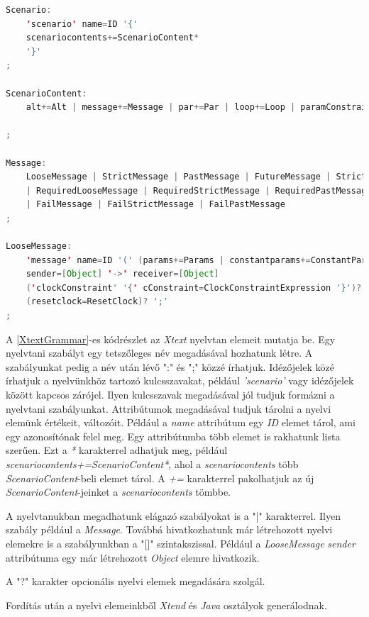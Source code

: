 \begin{lstlisting}[language=java, frame=single, float=ht!, caption={Xtext nyelvtan elemei.},captionpos=b, label=XtextGrammar]
Scenario:
	'scenario' name=ID '{'
	scenariocontents+=ScenarioContent*
	'}'
;

ScenarioContent:
	alt+=Alt | message+=Message | par+=Par | loop+=Loop | paramConstraint+=ParameterConstraint

;

Message:
	LooseMessage | StrictMessage | PastMessage | FutureMessage | StrictFutureMessage
	| RequiredLooseMessage | RequiredStrictMessage | RequiredPastMessage | RequiredFutureMessage | RequiredStrictFutureMessage
	| FailMessage | FailStrictMessage | FailPastMessage
;

LooseMessage:
	'message' name=ID '(' (params+=Params | constantparams+=ConstantParams) ')'
	sender=[Object] '->' receiver=[Object]
	('clockConstraint' '{' cConstraint=ClockConstraintExpression '}')? 
	(resetclock=ResetClock)? ';'
;
\end{lstlisting}

A \ref{XtextGrammar}-es kódrészlet az \textit{Xtext} nyelvtan elemeit mutatja be.
Egy nyelvtani szabályt egy tetszőleges név megadásával hozhatunk létre.
A szabályunkat pedig a név után lévő ":" és ";" közzé írhatjuk.
Idézőjelek közé írhatjuk a nyelvünkhöz tartozó kulcsszavakat, például \textit{'scenario'} vagy idézőjelek között kapcsos zárójel.
Ilyen kulcsszavak megadásával jól tudjuk formázni a nyelvtani szabályunkat.
Attribútumok megadásával tudjuk tárolni a nyelvi elemünk értékeit, változóit.
Például a \textit{name} attribútum egy \textit{ID} elemet tárol, ami egy azonosítónak felel meg.
Egy attribútumba több elemet is rakhatunk lista szerűen.
Ezt a \textit{*} karakterrel adhatjuk meg, például \textit{scenariocontents+=ScenarioContent*}, ahol a \textit{scenariocontents} több \textit{ScenarioContent}-beli elemet tárol.
A \textit{+=} karakterrel pakolhatjuk az új \textit{ScenarioContent}-jeinket a \textit{scenariocontents} tömbbe.

A nyelvtanukban megadhatunk elágazó szabályokat is a "|" karakterrel.
Ilyen szabály például a \textit{Message}.
Továbbá hivatkozhatunk már létrehozott nyelvi elemekre is a szabályunkban a "[]" szintakszissal.
Például a \textit{LooseMessage} \textit{sender} attribútuma egy már létrehozott \textit{Object} elemre hivatkozik.

A "?" karakter opcionális nyelvi elemek megadására szolgál.

Fordítás után a nyelvi elemeinkből \textit{Xtend} és \textit{Java} osztályok generálodnak.

